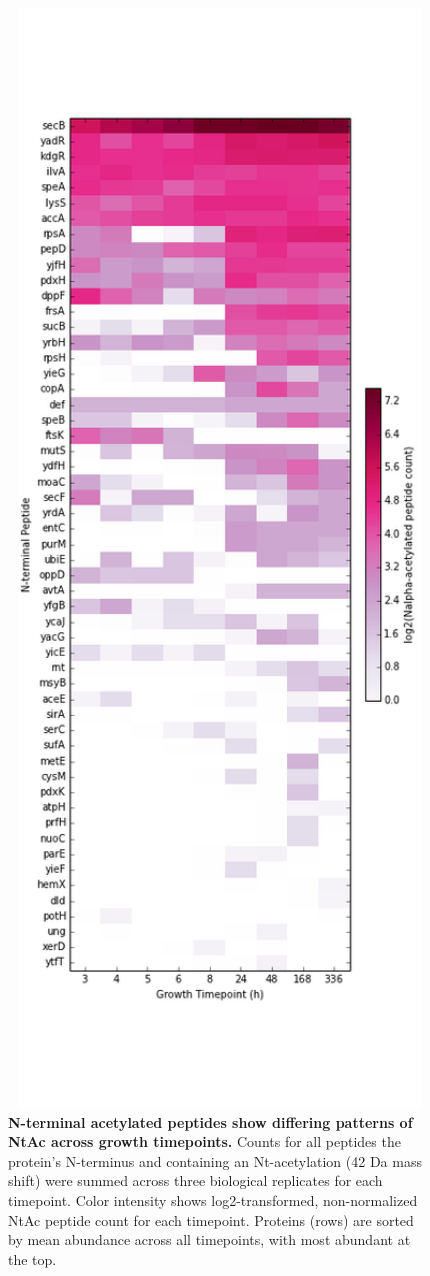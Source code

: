 \documentclass[12pt]{article}
\begin{document}
\clearpage
\begin{figure}[p]
\centerline{\includegraphics[width=5in]{Figures/AcetylatedProteins.png}}
\caption{\label{fig:Acet}\textbf{N-terminal acetylated peptides show differing patterns of NtAc across growth timepoints.} Counts for all peptides the protein's N-terminus and containing an Nt-acetylation (42 Da mass shift) were summed across three biological replicates for each timepoint.  Color intensity shows log2-transformed, non-normalized NtAc peptide count for each timepoint. Proteins (rows) are sorted by mean abundance across all timepoints, with most abundant at the top.}
\end{figure}
\end{document}
